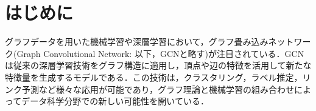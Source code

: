 \section{はじめに}

グラフデータを用いた機械学習や深層学習において，グラフ畳み込みネットワーク(Graph Convolutional Network: 以下，GCNと略す)が注目されている．GCNは従来の深層学習技術をグラフ構造に適用し，頂点や辺の特徴を活用して新たな特徴量を生成するモデルである．この技術は，クラスタリング，ラベル推定，リンク予測など様々な応用が可能であり，グラフ理論と機械学習の組み合わせによってデータ科学分野での新しい可能性を開いている．

